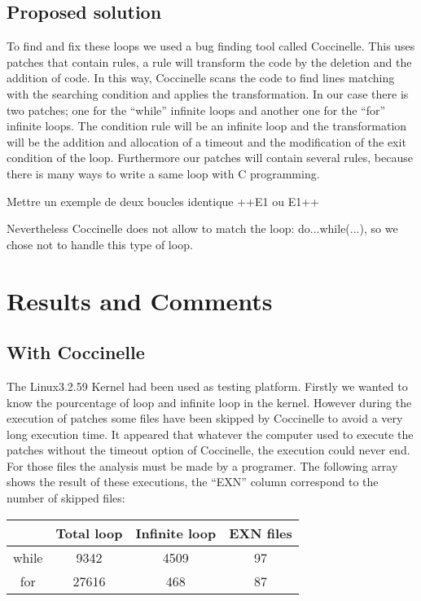 \documentclass[a4paper,12pt]{article}
\begin{document}
\subsection{Proposed solution}

To find and fix these loops we used a bug finding tool called Coccinelle. This uses patches that contain rules, a rule will transform the code by the deletion and the addition of code. In this way, Coccinelle scans the code to find lines matching with the searching condition and applies the transformation. In our case there is two patches; one for the ``while'' infinite loops and another one for the ``for'' infinite loops. The condition rule will be an infinite loop and the transformation will be the addition and allocation of a timeout and the modification of the exit condition of the loop. Furthermore our patches  will contain several rules, because there is many ways to write a same loop with C programming.

Mettre un exemple de deux boucles identique ++E1 ou E1++ 

Nevertheless Coccinelle does not allow to match the loop: do{...}while(...), so we chose not to handle this type of loop.


\section{Results and Comments}
\subsection{With Coccinelle}
The Linux3.2.59 Kernel had been used as testing platform. Firstly we wanted to know the pourcentage of loop and infinite loop in the kernel. However during the execution of patches some files have been skipped by Coccinelle to avoid a very long execution time. It appeared that whatever the computer used to execute the patches without the timeout option of Coccinelle, the execution could never end. For those files the analysis must be made by a programer. The following array shows the result of these executions, the ``EXN'' column correspond to the number of skipped files:


\vspace*{5mm}
\begin{tabular}{|c|c|c|c|}
  \hline
    & Total loop & Infinite loop & EXN files \\
  \hline
  while & 9342 &  4509  & 97 \\
  \hline
  for   &  27616 & 468 & 87 \\
  \hline
\end{tabular} 
\vspace*{5mm}
\end{document}
